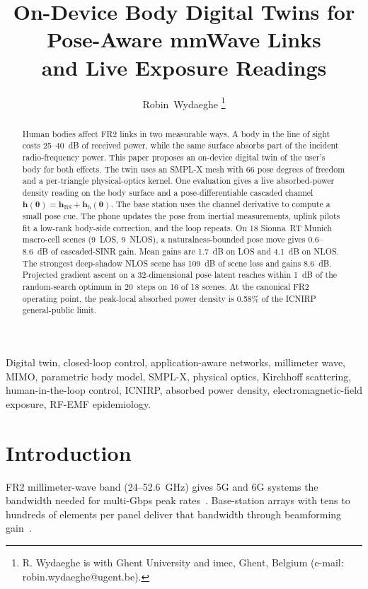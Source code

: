 \documentclass[journal,twocolumn,10pt]{IEEEtran}
\title{On-Device Body Digital Twins for Pose-Aware mmWave Links\\
and Live Exposure Readings}
\author{Robin~Wydaeghe%
  \thanks{R. Wydaeghe is with Ghent University and imec, Ghent, Belgium
  (e-mail: robin.wydaeghe@ugent.be).}}
\theoremstyle{plain}
\theoremstyle{definition}
\theoremstyle{remark}
\newcommand{\hh}{\bm{h}}
\newcommand{\thetab}{\bm{\theta}}
\newcommand{\hBS}{\bm{h}_{\mathrm{BS}}}
\newcommand{\hbody}{\bm{h}_{\mathrm{b}}}
\begin{document}
\maketitle

\begin{abstract}
Human bodies affect FR2 links in two measurable ways. A body in the
line of sight costs 25--40~dB of received power, while the same surface
absorbs part of the incident radio-frequency power. This paper proposes
an on-device digital twin of the user's body for both effects. The twin
uses an SMPL-X mesh with 66 pose degrees of freedom and a per-triangle
physical-optics kernel. One evaluation gives a live absorbed-power
density reading on the body surface and a pose-differentiable cascaded
channel $\hh(\thetab)=\hBS+\hbody(\thetab)$. The base station uses the
channel derivative to compute a small pose cue. The phone updates the
pose from inertial measurements, uplink pilots fit a low-rank
body-side correction, and the loop repeats. On 18 Sionna~RT Munich
macro-cell scenes (9~LOS, 9~NLOS), a naturalness-bounded pose move
gives 0.6--8.6~dB of cascaded-SINR gain. Mean gains are 1.7~dB on LOS
and 4.1~dB on NLOS. The strongest deep-shadow NLOS scene has 109~dB of
scene loss and gains 8.6~dB. Projected gradient ascent on a
32-dimensional pose latent reaches within 1~dB of the random-search
optimum in 20~steps on 16 of 18 scenes. At the canonical FR2 operating
point, the peak-local absorbed power density is 0.58\% of the ICNIRP
general-public limit.
\end{abstract}

\begin{IEEEkeywords}
Digital twin, closed-loop control, application-aware networks,
millimeter wave, MIMO, parametric body model, SMPL-X, physical optics,
Kirchhoff scattering, human-in-the-loop control, ICNIRP, absorbed
power density, electromagnetic-field exposure, RF-EMF epidemiology.
\end{IEEEkeywords}

\IEEEpeerreviewmaketitle


\section{Introduction}\label{sec:intro}

 FR2 millimeter-wave band (24--52.6~GHz) gives
5G and 6G systems the bandwidth needed for multi-Gbps peak
rates~\cite{general5G,TS38214}. Base-station arrays with tens to
hundreds of elements per panel deliver that bandwidth through
beamforming gain~\cite{HeathLozanoFA2018}.
\end{document}
